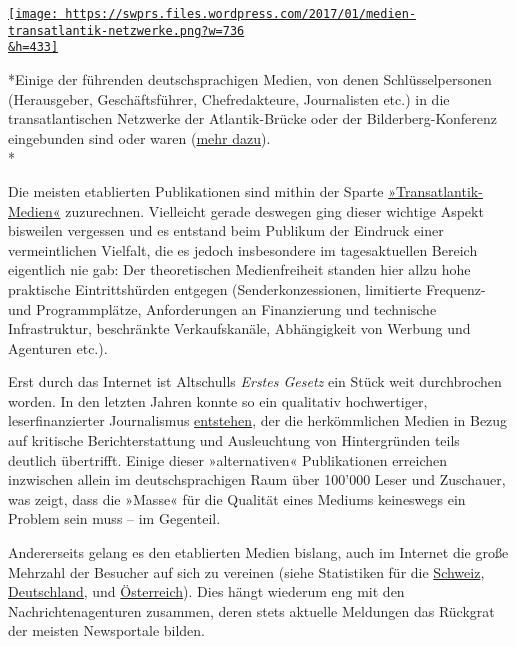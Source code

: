 \href{https://swprs.files.wordpress.com/2017/01/medien-transatlantik-netzwerke.png}{\texttt{[image: https://swprs.files.wordpress.com/2017/01/medien-transatlantik-netzwerke.png?w=736\\\&h=433]}}

*Einige der führenden deutsch­sprachigen Medien, von denen
Schlüssel­personen (Herausgeber, Geschäftsführer, Chefredakteure,
Journalisten etc.) in die transatlantischen Netzwerke der
Atlantik-Brücke oder der Bilderberg-Konferenz eingebunden sind oder
waren (\href{https://swprs.org/netzwerk-medien-deutschland/}{mehr
dazu}).\\
*

Die meisten etablierten Publikationen sind mithin der Sparte
\href{https://swprs.org/netzwerk-medien-deutschland/}{»Transatlantik-Medien«}
zuzurechnen. Vielleicht gerade deswegen ging dieser wichtige Aspekt
bisweilen vergessen und es entstand beim Publikum der Eindruck einer
vermeintlichen Vielfalt, die es jedoch insbesondere im tagesaktuellen
Bereich eigentlich nie gab: Der theoretischen Medienfreiheit standen
hier allzu hohe praktische Eintrittshürden entgegen (Senderkonzessionen,
limitierte Frequenz- und Programmplätze, Anforderungen an Finanzierung
und technische Infrastruktur, beschränkte Verkaufskanäle, Abhängigkeit
von Werbung und Agenturen etc.).

Erst durch das Internet ist Altschulls \emph{Erstes Gesetz} ein Stück
weit durchbrochen worden. In den letzten Jahren konnte so ein qualitativ
hochwertiger, leserfinanzierter Journalismus
\href{https://swprs.org/medien-navigator/}{entstehen}, der die
herkömmlichen Medien in Bezug auf kritische Bericht­erstattung und
Ausleuchtung von Hintergründen teils deutlich übertrifft. Einige dieser
»alternativen« Publikationen erreichen inzwischen allein im
deutsch­sprachigen Raum über 100'000 Leser und Zuschauer, was zeigt,
dass die »Masse« für die Qualität eines Mediums keineswegs ein Problem
sein muss -- im Gegenteil.

Andererseits gelang es den etablierten Medien bislang, auch im Internet
die große Mehrzahl der Besucher auf sich zu vereinen (siehe Statistiken
für die
\href{http://www.itmagazine.ch/Artikel/61130/Die_meistbesuchten_Schweizer_Websites_Top-5_unveraendert.html}{Schweiz},
\href{http://meedia.de/2016/02/09/ivw-news-top-50-januar-bringt-rekorde-fuer-focus-welt-faz-und-viele-andere/}{Deutschland,}
und
\href{http://www.oewa.at/basic/online-angebote?date=20160401}{Österreich}).
Dies hängt wiederum eng mit den Nachrichtenagenturen zusammen, deren
stets aktuelle Meldungen das Rückgrat der meisten Newsportale bilden.

